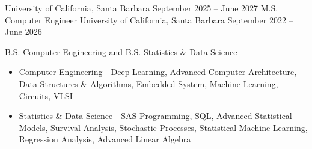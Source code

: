 \documentclass[9pt]{developercv} %
\begin{document}
\vspace{-8 pt}
\begin{entrylist}

\vspace{-4pt}

    \entry
    {}
    {University of California, Santa Barbara}
    {September 2025 – June 2027}
    {M.S. Computer Engineer}
    \entry
    {}
    {University of California, Santa Barbara}
    {September 2022 – June 2026}
    {B.S. Computer Engineering and B.S. Statistics \& Data Science
    \begin{itemize}[noitemsep,topsep=0pt,parsep=0pt,partopsep=0pt, leftmargin=10pt]
        \item Computer Engineering - Deep Learning, Advanced Computer Architecture, Data Structures \& Algorithms, Embedded System, Machine Learning, Circuits, VLSI
        \item Statistics \& Data Science - SAS Programming, SQL, Advanced Statistical Models, Survival Analysis, Stochastic Processes, Statistical Machine Learning, Regression Analysis, Advanced Linear Algebra
    \end{itemize}}



\end{entrylist}
\end{document}
